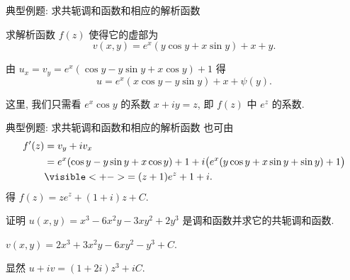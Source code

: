 \begin{frame}{典型例题: 求共轭调和函数和相应的解析函数}
	\beqskip{4pt}
	\onslide<+->
	\begin{example}
		求解析函数 $f(z)$ 使得它的虚部为
		\[v(x,y)=e^x(y\cos y+x\sin y)+x+y.\]
	\end{example}

	\onslide<+->
	\begin{solution}
		由 $u_x=v_y=e^x(\cos y-y\sin y+x\cos y)+1$ 得
		\[
			u=e^x(x\cos y-y\sin y)+x+\psi(y).
		\]
		\vspace{-\baselineskip}
	\end{solution}
	\onslide<+->
	这里, 我们只需看 $e^x\cos y$ 的系数 $x+iy=z$, 即 $f(z)$ 中 $e^z$ 的系数.
	\endgroup
\end{frame}


\begin{frame}{典型例题: 求共轭调和函数和相应的解析函数}
	\onslide<+->
	也可由
	\begin{align*}
		f'(z)&=v_y+iv_x\\
		&=e^x(\cos y-y\sin y+x\cos y)+1
		+i\bigl(e^x(y\cos y+x\sin y+\sin y)+1\bigr)\\
		&\visible<+->{=(z+1)e^z+1+i.}
	\end{align*}
	\onslide<+->
	得 $f(z)=ze^z+(1+i)z+C$.
	\onslide<+->
	\begin{exercise}
		证明 $u(x,y)=x^3-6x^2y-3xy^2+2y^3$ 是调和函数并求它的共轭调和函数.
	\end{exercise}

	\onslide<+->
	\begin{answer}
		$v(x,y)=2x^3+3x^2y-6xy^2-y^3+C$.
	\end{answer}
	\onslide<+->
	显然 $u+iv=(1+2i)z^3+iC$.
\end{frame}

